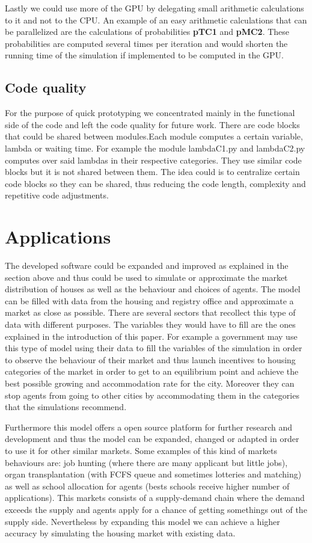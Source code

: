 Lastly we could use more of the GPU by delegating small arithmetic calculations to it and not to the CPU. An example of an easy arithmetic calculations that can be parallelized are the calculations of probabilities \textbf{pTC1} and \textbf{pMC2}. These probabilities are computed several times per iteration and would shorten the running time of the simulation if implemented to be computed in the GPU.

\subsection{Code quality}

For the purpose of quick prototyping we concentrated mainly in the functional side of the code and left the code quality for future work. There are code blocks that could be shared between modules.Each module computes a certain variable, lambda or waiting time. For example the module lambdaC1.py and lambdaC2.py computes over said lambdas in their respective categories. They use similar code blocks but it is not shared between them. The idea could is to centralize certain code blocks so they can be shared, thus reducing the code length, complexity and repetitive code adjustments.

\section{Applications}
The developed software could be expanded and improved as explained in the section above and thus could be used to simulate or approximate the market distribution of houses as well as the behaviour and choices of agents. The model can be filled with data from the housing and registry office and approximate a market as close as possible. There are several sectors that recollect this type of data with different purposes. The variables they would have to fill are the ones explained in the introduction of this paper. For example a government may use this type of model using their data to fill the variables of the simulation in order to observe the behaviour of their market and thus launch incentives to housing categories of the market in order to get to an equilibrium point and achieve the best possible growing and accommodation rate for the city. Moreover they can stop agents from going to other cities by accommodating them in the categories that the simulations recommend.

Furthermore this model offers a open source platform for further research and development and thus the model can be expanded, changed or adapted in order to use it for other similar markets. Some examples of this kind of markets behaviours are: job hunting (where there are many applicant but little jobs), organ transplantation (with  FCFS queue and sometimes lotteries and matching) as well as school allocation for agents (bests schools receive higher number of applications). This markets consists of a supply-demand chain where the demand exceeds the supply and agents apply for a chance of getting somethings out of the supply side. Nevertheless by expanding this model we can achieve a higher accuracy by simulating the housing market with existing data.

